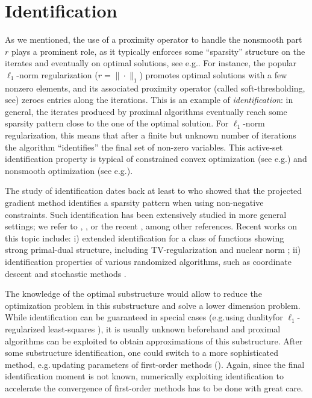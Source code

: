 \section{Identification}\label{sec:basics_identificationn}
As we mentioned, the use of a proximity operator to handle the nonsmooth part $r$ plays a prominent role, as it typically enforces some ``sparsity'' structure on the iterates and eventually on optimal solutions, see e.g.\;\cite{vaiter2015model}. For instance, the popular $\ell_1$-norm regularization ($r=\|\cdot\|_1$) promotes optimal solutions with a few nonzero elements, and its associated proximity operator (called soft-thresholding, see\;\cite{donoho1995noising}) zeroes entries along the iterations. This is an example of \emph{identification}: in general, the iterates produced by proximal algorithms eventually reach some sparsity pattern close to the one of the optimal solution. For $\ell_1$-norm regularization, this means that after a finite but unknown number of iterations the algorithm ``identifies'' the final set of non-zero variables. This active-set identification property is typical of constrained convex optimization (see e.g.\;\cite{wright1993identifiable}) and nonsmooth optimization (see e.g.\;\cite{hare2004identifying}).

The study of identification dates back at least to \cite{bertsekas1976goldstein} who showed that the projected gradient method identifies a sparsity pattern when using non-negative constraints. Such identification has been extensively studied in more general settings; we refer to \cite{burke1988identification}, \cite{lewis2002active}, \cite{drusvyatskiy2014optimality} or the recent \cite{lewis2018partial}, among other references.
Recent works on this topic include: i) extended identification for a class of functions showing strong primal-dual structure, including TV-regularization and nuclear norm \cite{fadili2018sensitivity}; ii) identification properties of various randomized algorithms, such as coordinate descent \cite{wright2012accelerated} and stochastic methods \cite{poon2018local,fadili2018model,sun2019we}.

The knowledge of the optimal substructure would allow to reduce the optimization problem in this substructure and solve a lower dimension problem. While identification can be guaranteed in special cases  (e.g.\;using duality\;for $\ell_1$-regularized least-squares \cite{ogawa2013safe, fercoq2015mind}), 
it is usually unknown beforehand and proximal algorithms can be exploited to obtain approximations of this substructure.
%  
After some substructure identification, one could switch to a more sophisticated method, e.g.\,updating parameters of first-order methods (\cite{liang2017activity}).
Again, since the final identification moment is not known, numerically exploiting identification to accelerate the convergence of first-order methods has to be done with great care.

